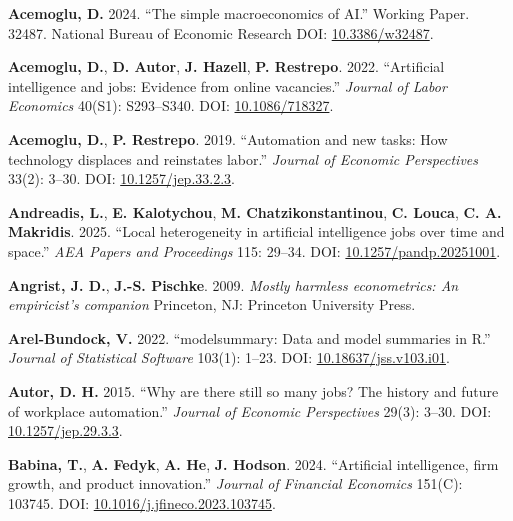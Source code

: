 \documentclass[
]{article}
\newlength{\cslhangindent}
\newenvironment{CSLReferences}[2] %
 {\begin{list}{}{%
  \setlength{\itemindent}{0pt}
  \setlength{\leftmargin}{0pt}
  \setlength{\parsep}{0pt}
  \ifodd #1
   \setlength{\leftmargin}{\cslhangindent}
   \setlength{\itemindent}{-1\cslhangindent}
  \fi
  \setlength{\itemsep}{#2\baselineskip}}}
 {\end{list}}
\begin{document}
\label{refs}
\begin{CSLReferences}{1}{0}
\textbf{Acemoglu, D.} 2024. {``The simple macroeconomics of {AI}.''}
Working Paper. 32487. National Bureau of Economic Research DOI:
\href{https://doi.org/10.3386/w32487}{10.3386/w32487}.

\textbf{Acemoglu, D.}, \textbf{D. Autor}, \textbf{J. Hazell}, \textbf{P.
Restrepo}. 2022. {``Artificial intelligence and jobs: Evidence from
online vacancies.''} \emph{Journal of Labor Economics} 40(S1):
S293--S340. DOI: \href{https://doi.org/10.1086/718327}{10.1086/718327}.

\textbf{Acemoglu, D.}, \textbf{P. Restrepo}. 2019. {``Automation and new
tasks: How technology displaces and reinstates labor.''} \emph{Journal
of Economic Perspectives} 33(2): 3--30. DOI:
\href{https://doi.org/10.1257/jep.33.2.3}{10.1257/jep.33.2.3}.

\textbf{Andreadis, L.}, \textbf{E. Kalotychou}, \textbf{M.
Chatzikonstantinou}, \textbf{C. Louca}, \textbf{C. A. Makridis}. 2025.
{``Local heterogeneity in artificial intelligence jobs over time and
space.''} \emph{AEA Papers and Proceedings} 115: 29--34. DOI:
\href{https://doi.org/10.1257/pandp.20251001}{10.1257/pandp.20251001}.

\textbf{Angrist, J. D.}, \textbf{J.-S. Pischke}. 2009. \emph{Mostly
harmless econometrics: An empiricist's companion} Princeton, NJ:
Princeton University Press.

\textbf{Arel-Bundock, V.} 2022. {``{modelsummary}: Data and model
summaries in {R}.''} \emph{Journal of Statistical Software} 103(1):
1--23. DOI:
\href{https://doi.org/10.18637/jss.v103.i01}{10.18637/jss.v103.i01}.

\textbf{Autor, D. H.} 2015. {``Why are there still so many jobs? The
history and future of workplace automation.''} \emph{Journal of Economic
Perspectives} 29(3): 3--30. DOI:
\href{https://doi.org/10.1257/jep.29.3.3}{10.1257/jep.29.3.3}.

\textbf{Babina, T.}, \textbf{A. Fedyk}, \textbf{A. He}, \textbf{J.
Hodson}. 2024. {``Artificial intelligence, firm growth, and product
innovation.''} \emph{Journal of Financial Economics} 151(C): 103745.
DOI:
\href{https://doi.org/10.1016/j.jfineco.2023.103745}{10.1016/j.jfineco.2023.103745}.


\end{CSLReferences}
\end{document}
